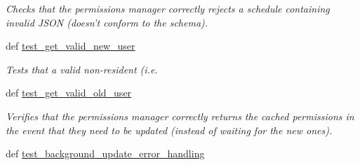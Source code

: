 \begin{DoxyCompactItemize}
\begin{DoxyCompactList}\small\item\em Checks that the permissions manager correctly rejects a schedule containing invalid J\-S\-O\-N (doesn't conform to the schema). \end{DoxyCompactList}\item 
def \hyperlink{classhwm_1_1network_1_1security_1_1tests_1_1test__permission__manager_1_1_test_permission_manager_a34314ab1fd59a33168e3fa16d57e4dab}{test\-\_\-get\-\_\-valid\-\_\-new\-\_\-user}
\begin{DoxyCompactList}\small\item\em Tests that a valid non-\/resident (i.\-e. \end{DoxyCompactList}\item 
\hypertarget{classhwm_1_1network_1_1security_1_1tests_1_1test__permission__manager_1_1_test_permission_manager_a603f45b0113fa8309419c11ced6eafc6}{def \hyperlink{classhwm_1_1network_1_1security_1_1tests_1_1test__permission__manager_1_1_test_permission_manager_a603f45b0113fa8309419c11ced6eafc6}{test\-\_\-get\-\_\-valid\-\_\-old\-\_\-user}}\label{classhwm_1_1network_1_1security_1_1tests_1_1test__permission__manager_1_1_test_permission_manager_a603f45b0113fa8309419c11ced6eafc6}

\begin{DoxyCompactList}\small\item\em Verifies that the permissions manager correctly returns the cached permissions in the event that they need to be updated (instead of waiting for the new ones). \end{DoxyCompactList}\item 
\hypertarget{classhwm_1_1network_1_1security_1_1tests_1_1test__permission__manager_1_1_test_permission_manager_aedf0b2442119d17932394093d6a7edce}{def \hyperlink{classhwm_1_1network_1_1security_1_1tests_1_1test__permission__manager_1_1_test_permission_manager_aedf0b2442119d17932394093d6a7edce}{test\-\_\-background\-\_\-update\-\_\-error\-\_\-handling}}\label{classhwm_1_1network_1_1security_1_1tests_1_1test__permission__manager_1_1_test_permission_manager_aedf0b2442119d17932394093d6a7edce}


\end{DoxyCompactItemize}
